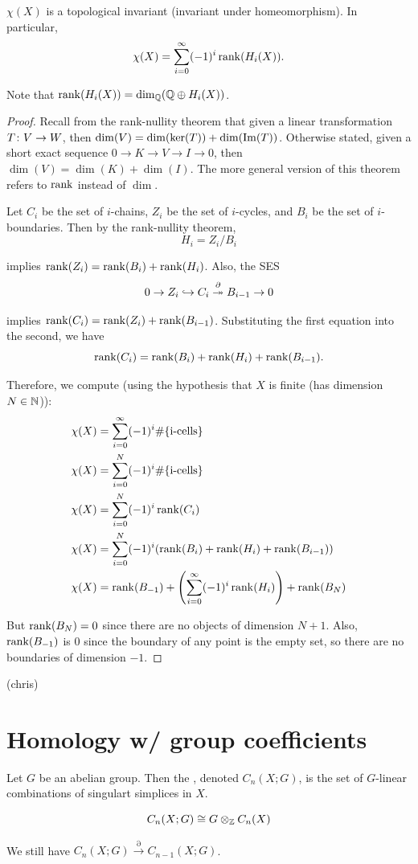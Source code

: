 \documentclass[11pt,leqno,oneside]{amsart}
\newenvironment{dateenv}{
  \vspace{1em}
}{
  \vspace{1em}
}
\newcommand{\mydate}[4]{
  \newdate{#1}{#2}{#3}{#4}
  \begin{dateenv}
    \hfill\displaydate{#1}
  \end{dateenv}
}
\numberwithin{thm}{section}
\renewcommand{\d}{\partial}
\begin{document}
\begin{thm}
  $\chi(X)$ is a topological invariant (invariant under homeomorphism).  In particular,
  $$ \chi(X) = \sum_{i=0}^\infty (-1)^i \operatorname{rank}(H_i(X)). $$

  Note that $\operatorname{rank}(H_i(X)) = \dim_{{\mathbb Q}}({\mathbb Q} \oplus H_i(X))$.
\end{thm}
\begin{proof}
  Recall from the rank-nullity theorem that given a linear transformation $T \colon V \to W$, then $\dim(V) = \dim(\ker(T)) + \dim(\operatorname{Im}(T))$.  Otherwise stated, given a short exact sequence $0 \to K \to V \to I \to 0$, then $\dim(V) = \dim(K) + \dim(I)$.  The more general version of this theorem refers to $\operatorname{rank}$ instead of $\dim$.

  Let $C_i$ be the set of $i$-chains, $Z_i$ be the set of $i$-cycles, and $B_i$ be the set of $i$-boundaries.  Then by the rank-nullity theorem,
  $$ H_i = Z_i/B_i $$

  implies $\operatorname{rank}(Z_i) = \operatorname{rank}(B_i) + \operatorname{rank}(H_i)$.  Also, the SES
  $$ 0 \to Z_i \into C_i \overset{\d}{\onto} B_{i-1} \to 0 $$

  implies $\operatorname{rank}(C_i) = \operatorname{rank}(Z_i) + \operatorname{rank}(B_{i-1})$.  Substituting the first equation into the second, we have
  $$ \operatorname{rank}(C_i) = \operatorname{rank}(B_i) + \operatorname{rank}(H_i) + \operatorname{rank}(B_{i-1}).$$

  Therefore, we compute (using the hypothesis that $X$ is finite (has dimension $N \in {\mathbb N}$)):
  \begin{align}
    \chi(X) &= \sum_{i=0}^\infty (-1)^i \#\{\text{i-cells}\} \\
    \chi(X) &= \sum_{i=0}^N (-1)^i \#\{\text{i-cells}\} \\
    \chi(X) &= \sum_{i=0}^N (-1)^i \operatorname{rank}(C_i) \\
    \chi(X) &= \sum_{i=0}^N (-1)^i (\operatorname{rank}(B_i) + \operatorname{rank}(H_i) + \operatorname{rank}(B_{i-1})) \\
    \chi(X) &= \operatorname{rank}(B_{-1}) + \left(\sum_{i=0}^\infty (-1)^i \operatorname{rank}(H_i)\right) + \operatorname{rank}(B_N)
  \end{align}

  But $\operatorname{rank}(B_N) = 0$ since there are no objects of dimension $N+1$.  Also, $\operatorname{rank}(B_{-1})$ is 0 since the boundary of any point is the empty set, so there are no boundaries of dimension $-1$.
\end{proof}

\mydate{dj}{14}{4}{2017}
(chris)

\section*{Homology w/ group coefficients}
\begin{defn}
  Let $G$ be an abelian group.  Then the , denoted $C_n(X; G)$, is the set of $G$-linear combinations of singulart simplices in $X$.
\end{defn}
\begin{prop}
  $$ C_n(X; G) \mathrel{\cong} G \otimes_{\mathbb Z} C_n(X) $$
\end{prop}
  We still have $C_n(X; G) \overset{\d}{\to} C_{n-1}(X; G)$.
\end{document}
